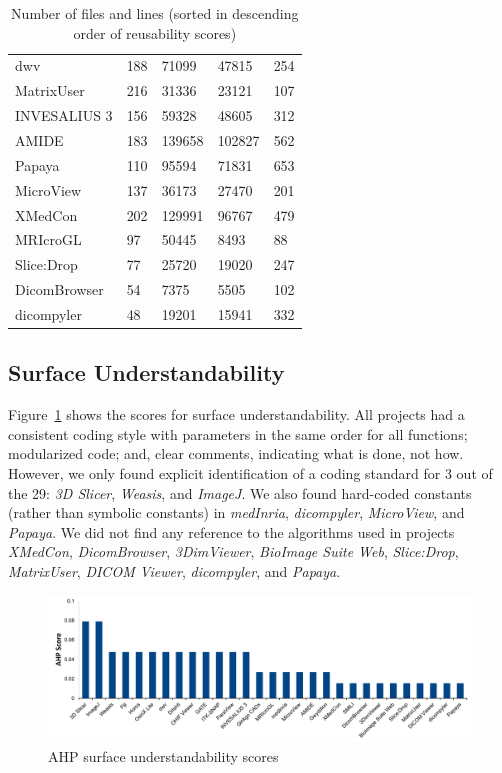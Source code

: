 \documentclass[11pt]{article}
\begin{document}
\begin{table}[!ht]
\begin{tabular}{lllll}
dwv & 188 & 71099 & 47815 & 254 \\
MatrixUser & 216 & 31336 & 23121 & 107 \\
INVESALIUS 3 & 156 & 59328 & 48605 & 312 \\
AMIDE & 183 & 139658 & 102827 & 562 \\
Papaya & 110 & 95594 & 71831 & 653 \\
MicroView & 137 & 36173 & 27470 & 201 \\
XMedCon & 202 & 129991 & 96767 & 479 \\
MRIcroGL & 97 & 50445 & 8493 & 88 \\
Slice:Drop & 77 & 25720 & 19020 & 247 \\
DicomBrowser & 54 & 7375 & 5505 & 102 \\
dicompyler & 48 & 19201 & 15941 & 332 \\ 
\bottomrule
\end{tabular}
\caption{Number of files and lines (sorted in descending order of reusability
scores)}
\label{tab_loc_per_file}
\end{table}

\subsection{Surface Understandability} \label{sec_result_understandability}

Figure~\ref{fg_surface_understandability_scores} shows the scores for surface
understandability. All projects had a consistent coding style with parameters in
the same order for all functions; modularized code; and, clear comments, indicating
what is done, not how. However, we only found explicit identification of a
coding standard for 3 out of the 29: \textit{3D Slicer}, \textit{Weasis}, and
\textit{ImageJ}. We also found hard-coded constants (rather than symbolic
constants) in \textit{medInria}, \textit{dicompyler}, \textit{MicroView}, and
\textit{Papaya}. We did not find any reference to the algorithms used in
projects \textit{XMedCon}, \textit{DicomBrowser}, \textit{3DimViewer},
\textit{BioImage Suite Web}, \textit{Slice:Drop}, \textit{MatrixUser},
\textit{DICOM Viewer}, \textit{dicompyler}, and \textit{Papaya}. 

\begin{figure}[!ht]
\includegraphics[scale=0.47]{understandability_scores.pdf}
\caption{AHP surface understandability scores}
\label{fg_surface_understandability_scores}
\end{figure}
\end{document}
